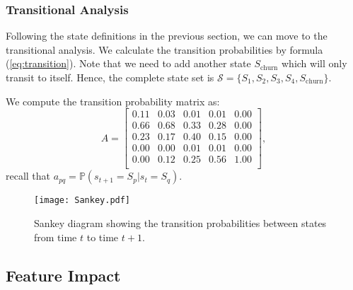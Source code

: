 \subsubsection{Transitional Analysis}

Following the state definitions in the previous section, we can move to the transitional analysis. We calculate the transition probabilities by formula (\ref{eq:transition}). Note that we need to add another state $S_\text{churn}$ which will only transit to itself. Hence, the complete state set is $\mathcal{S} = \{S_1, S_2, S_3, S_4, S_\text{churn}\}$.

We compute the transition probability matrix as:
\begin{equation}
A = 
\begin{bmatrix}
0.11 & 0.03 & 0.01 & 0.01 & 0.00 \\
0.66 & 0.68 & 0.33 & 0.28 & 0.00 \\
0.23 & 0.17 & 0.40 & 0.15 & 0.00 \\
0.00 & 0.00 & 0.01 & 0.01 & 0.00 \\
0.00 & 0.12 & 0.25 & 0.56 & 1.00 \\
\end{bmatrix},
\end{equation}
recall that $a_{pq} = \mathbb{P} (s_{t+1} = S_p | s_t = S_q)$.

\begin{figure}[!h]
\centering
\texttt{[image: Sankey.pdf]}
\caption{Sankey diagram showing the transition probabilities between states from time $t$ to time $t+1$.}
\label{fig:sankey}
\end{figure}


\subsection{Feature Impact}
